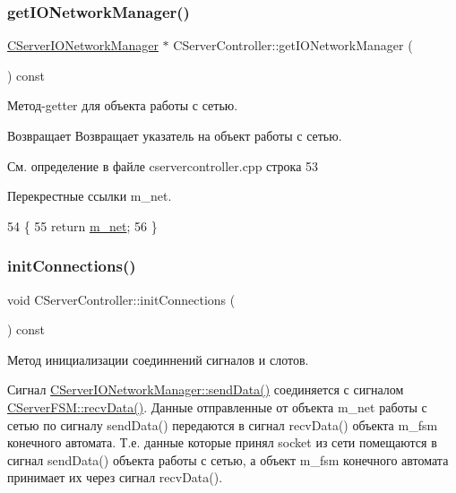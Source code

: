 \subsubsection{\texorpdfstring{get\+I\+O\+Network\+Manager()}{getIONetworkManager()}}
{\footnotesize\ttfamily \hyperlink{class_c_server_i_o_network_manager}{C\+Server\+I\+O\+Network\+Manager} $\ast$ C\+Server\+Controller\+::get\+I\+O\+Network\+Manager (\begin{DoxyParamCaption}{ }\end{DoxyParamCaption}) const}



Метод-\/getter для объекта работы с сетью. 

\begin{DoxyReturn}{Возвращает}
Возвращает указатель на объект работы с сетью. 
\end{DoxyReturn}


См. определение в файле cservercontroller.\+cpp строка 53



Перекрестные ссылки m\+\_\+net.


\begin{DoxyCode}
54 \{
55     \textcolor{keywordflow}{return} \hyperlink{class_c_server_controller_a64ce9925628d153d9576ee4534380dac}{m\_net};
56 \}
\end{DoxyCode}
\hypertarget{class_c_server_controller_aeccfde1d541a9f57f8276cc6a24aea12}{}\label{class_c_server_controller_aeccfde1d541a9f57f8276cc6a24aea12} 
\subsubsection{\texorpdfstring{init\+Connections()}{initConnections()}}
{\footnotesize\ttfamily void C\+Server\+Controller\+::init\+Connections (\begin{DoxyParamCaption}{ }\end{DoxyParamCaption}) const}



Метод инициализации соединнений сигналов и слотов. 

Сигнал \hyperlink{class_c_abstruct_controller_item_a7cf2bebc87a7d0b660318e946a176eb9}{C\+Server\+I\+O\+Network\+Manager\+::send\+Data()} соединяется с сигналом \hyperlink{class_c_abstruct_controller_item_a6898e48061cb0cac2065f8193bd386c1}{C\+Server\+F\+S\+M\+::recv\+Data()}. Данные отправленные от объекта m\+\_\+net работы с сетью по сигналу send\+Data() передаются в сигнал recv\+Data() объекта m\+\_\+fsm конечного автомата. Т.\+е. данные которые принял socket из сети помещаются в сигнал send\+Data() объекта работы с сетью, а объект m\+\_\+fsm конечного автомата принимает их через сигнал recv\+Data().


